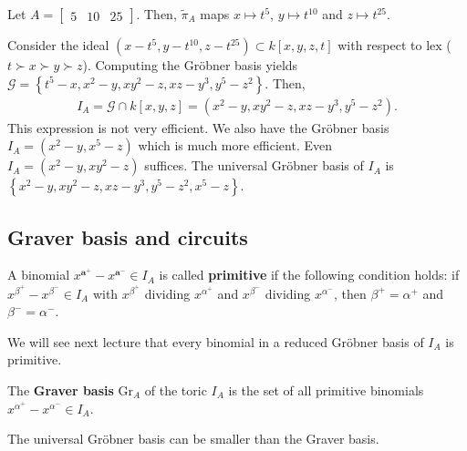 \documentclass[a4paper, 11pt]{article}
\begin{document}
\begin{eg}
Let \( A = \begin{bmatrix}
  5 & 10 & 25
\end{bmatrix} \). Then, \( \tilde \pi_A \) maps \( x \mapsto t^5 \), \( y \mapsto t^{10} \) and \( z \mapsto t^{25} \). 

Consider the ideal \( (x - t^5, y-t^{10}, z-t^{25}) \subset k[x,y,z,t] \) with respect to \( \mathrm{lex} \) (\( t \succ x \succ y \succ z \)). Computing the Gröbner basis yields \( \mathcal{G} = \left\{ t^5 - x, x^2 - y, xy^2 - z, xz - y^3, y^5 - z^2 \right\} \). Then, 
\begin{align*}
  I_A = \mathcal{G} \cap k [x,y,z] = \left( x^2 - y, xy^2 - z, xz - y^3, y^5 - z^2 \right).
\end{align*}
This expression is not very efficient. We also have the Gröbner basis \( I_A = (x^2 - y, x^5 - z) \) which is much more efficient. Even \( I_A = (x^2 - y, xy^2 - z) \) suffices. The universal Gröbner basis of \( I_A \) is \(   \left\{ x^2 - y, xy^2 - z, xz - y^3, y^5 - z^2, x^5 - z \right\}\).
\end{eg}

\subsection{Graver basis and circuits}

\begin{defi}
  A binomial \( x^{\mathbf a^{+}} - x^{\mathbf a^{-}} \in I_A \) is called \textbf{primitive} if the following condition holds: if \(  x^{\beta^+} - x^{\beta^-} \in I_A \) with \( x^{\beta^+} \) dividing \( x^{\alpha^+} \) and \( x^{\beta^-} \) dividing \( x^{\alpha^-} \), then \( \beta^+ = \alpha^+ \) and \( \beta^- = \alpha^- \).
\end{defi}

\begin{remark}
  We will see next lecture that every binomial in a reduced Gröbner basis of \( I_A \) is primitive.
\end{remark}

\begin{defi}
  The \textbf{Graver basis} \( \mathrm{Gr}_A \) of the toric \( I_A \) is the set of all primitive binomials \( x^{\alpha^+} - x^{\alpha^-} \in I_A \).
\end{defi}

\begin{remark}
  The universal Gröbner basis can be smaller than the Graver basis.
\end{remark}
\end{document}

